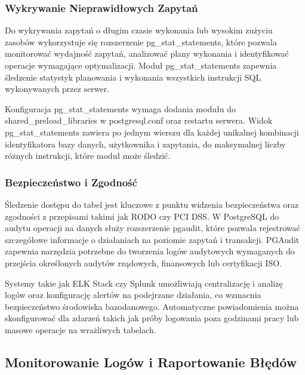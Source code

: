 \documentclass[a4paper,11pt,openany,english]{sphinxmanual}
\begin{document}
\subsubsection{Wykrywanie Nieprawidłowych Zapytań}
\label{\detokenize{rozdzial2/Monitorowanie-i-diagnostyka/index:wykrywanie-nieprawidlowych-zapytan}}
\sphinxAtStartPar
Do wykrywania zapytań o długim czasie wykonania lub wysokim zużyciu zasobów wykorzystuje się rozszerzenie pg\_stat\_statements, które pozwala monitorować wydajność zapytań, analizować plany wykonania i identyfikować operacje wymagające optymalizacji. Moduł pg\_stat\_statements zapewnia śledzenie statystyk planowania i wykonania wszystkich instrukcji SQL wykonywanych przez serwer.

\sphinxAtStartPar
Konfiguracja pg\_stat\_statements wymaga dodania modułu do shared\_preload\_libraries w postgresql.conf oraz restartu serwera. Widok pg\_stat\_statements zawiera po jednym wierszu dla każdej unikalnej kombinacji identyfikatora bazy danych, użytkownika i zapytania, do maksymalnej liczby różnych instrukcji, które moduł może śledzić.


\subsubsection{Bezpieczeństwo i Zgodność}
\label{\detokenize{rozdzial2/Monitorowanie-i-diagnostyka/index:bezpieczenstwo-i-zgodnosc}}
\sphinxAtStartPar
Śledzenie dostępu do tabel jest kluczowe z punktu widzenia bezpieczeństwa oraz zgodności z przepisami takimi jak RODO czy PCI DSS. W PostgreSQL do audytu operacji na danych służy rozszerzenie pgaudit, które pozwala rejestrować szczegółowe informacje o działaniach na poziomie zapytań i transakcji. PGAudit zapewnia narzędzia potrzebne do tworzenia logów audytowych wymaganych do przejścia określonych audytów rządowych, finansowych lub certyfikacji ISO.

\sphinxAtStartPar
Systemy takie jak ELK Stack czy Splunk umożliwiają centralizację i analizę logów oraz konfigurację alertów na podejrzane działania, co wzmacnia bezpieczeństwo środowiska bazodanowego. Automatyczne powiadomienia można skonfigurować dla zdarzeń takich jak próby logowania poza godzinami pracy lub masowe operacje na wrażliwych tabelach.


\subsection{Monitorowanie Logów i Raportowanie Błędów}
\label{\detokenize{rozdzial2/Monitorowanie-i-diagnostyka/index:monitorowanie-logow-i-raportowanie-bledow}}
\end{document}
